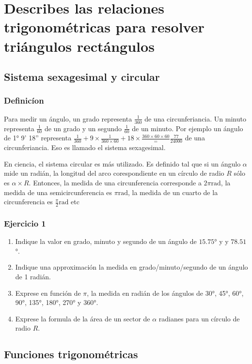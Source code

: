 \chapter{Describes las relaciones trigonométricas para resolver triángulos rectángulos}

\section{Sistema sexagesimal y circular}

\subsection{Definicíon}

Para medir un ángulo, un grado representa $\frac{1}{360}$ de una
circunferiancia. Un minuto representa $\frac{1}{60}$ de un grado y un segundo
$\frac{1}{60}$ de un minuto. Por ejemplo un ángulo de 1° 9' 18'' representa
$\frac{1}{360} + 9 \times \frac{1}{360 \times 60} + 18 \times \frac{360 \times 60 \times 60} = \frac{77}{24000}$ de una circunferiancia. Eso es llamado el
sistema sexagesimal.

En ciencia, el sistema circular es más utilizado. Es definido tal que si un
ángulo $\alpha$ mide un radián, la longitud del arco corespondiente en
un círculo de radio $R$ sólo es $\alpha \times R$. Entonces, la medida de una
circunferencia corresponde a $2\pi \text{rad}$, la medida de una
semicircunferencia es $\pi \text{rad}$, la medida de un cuarto de la
circunferencia es $\frac{\pi}{2} \text{rad}$ etc

\subsection{Ejercicio 1}

\begin{enumerate}
\item Indique la valor en grado, minuto y segundo de un ángulo de $15.75$° y
  y $78.51$°.
\item Indique una approximación la medida en grado/minuto/segundo de un ángulo
  de 1 radián.
\item Exprese en función de $\pi$, la medida en radián de los ángulos de
  30°, 45°, 60°, 90°, 135°, 180°, 270° y 360°.
\item Exprese la formula de la área de un sector de $\alpha$ radianes para
  un círculo de radio $R$.
\end{enumerate}

\section{Funciones trigonométricas}

